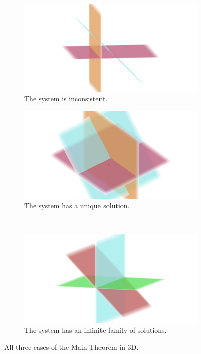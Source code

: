 \documentclass[a4paper,leqno]{article}
\numberwithin{equation}{section}
\theoremstyle{definition}
\theoremstyle{remark}
\begin{document}
\begin{figure}
  \centering
  \begin{subfigure}{0.45\textwidth}\includegraphics[width = \textwidth]{planes_inconsistent}\caption{The system is inconsistent.}\end{subfigure}%
  \begin{subfigure}{0.45\textwidth}\includegraphics[width = \textwidth]{planes_point}\caption{The system has a unique solution.}\end{subfigure}\\%
  \begin{subfigure}{0.45\textwidth}\includegraphics[width = \textwidth]{planes_line}\caption{The system has an infinite family of solutions.}\end{subfigure}%
  \caption{All three cases of the Main Theorem in 3D. \label{fig:mainthm3d}}
\end{figure}
\end{document}
